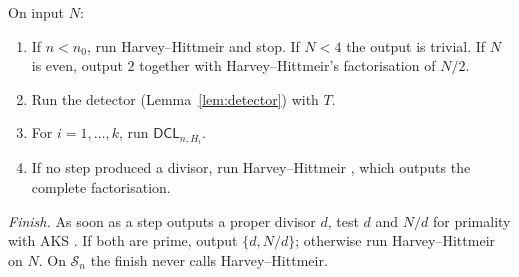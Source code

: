 \documentclass[11pt]{amsart}
\theoremstyle{definition}
\newcommand{\Sn}{\mathcal{S}_n}
\newcommand{\DCL}{\textsf{DCL}}
\begin{document}
On input $N$:
\begin{enumerate}[label=\arabic*.,start=0]
\item If $n<n_0$, run Harvey--Hittmeir and stop. If $N<4$ the output is trivial. If $N$ is
  even, output $2$ together with Harvey--Hittmeir's factorisation of $N/2$.
\item Run the detector (Lemma~\ref{lem:detector}) with $T$.
\item For $i=1,\dots,k$, run $\DCL_{n,H_i}$.
\item If no step produced a divisor, run Harvey--Hittmeir \cite{hh2022}, which outputs the
  complete factorisation.
\end{enumerate}
\emph{Finish.} As soon as a step outputs a proper divisor $d$, test $d$ and $N/d$ for primality
with AKS \cite{aks2004}. If both are prime, output $\{d,N/d\}$; otherwise run Harvey--Hittmeir on
$N$. On $\Sn$ the finish never calls Harvey--Hittmeir.
\end{document}
